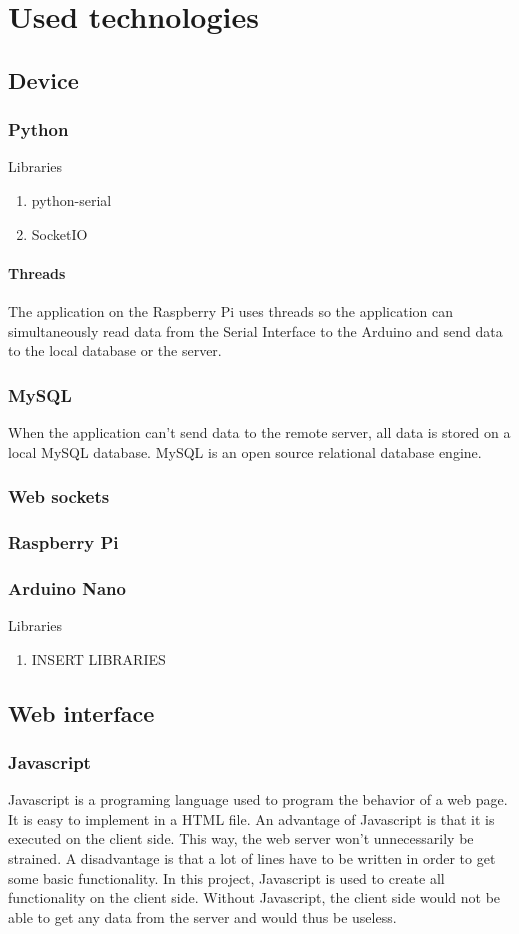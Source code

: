 \section{Used technologies}
\subsection{Device}
\subsubsection{Python}
Libraries
\begin{enumerate}
 \item python-serial
 \item SocketIO
\end{enumerate}
\paragraph{Threads}
The application on the Raspberry Pi uses threads so the application can simultaneously read data from the Serial Interface to the Arduino and send data to the local database or the server.
\subsubsection{MySQL}
When the application can't send data to the remote server, all data is stored on a local MySQL database. MySQL is an open source relational database engine.
\subsubsection{Web sockets}
\subsubsection{Raspberry Pi}
\subsubsection{Arduino Nano}
Libraries
\begin{enumerate}
 \item INSERT LIBRARIES
\end{enumerate}

\subsection{Web interface}
\subsubsection{Javascript}
Javascript is a programing language used to program the behavior of a web page.
It is easy to implement in a HTML file. An advantage of Javascript is that it is
executed on the client side. This way, the web server won't unnecessarily be strained.
A disadvantage is that a lot of lines have to be written in order to get some basic
functionality. In this project, Javascript is used to create all functionality on the
client side. Without Javascript, the client side would not be able to get any data from
the server and would thus be useless. 

